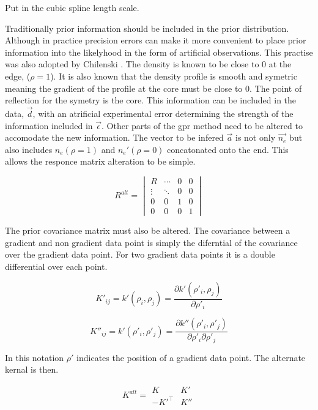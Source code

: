 Put in the cubic spline length scale. 

Traditionally prior information should be included in the prior distribution. Although in practice precision errors can make it more convenient to place prior information into the likelyhood in the form of artificial observations. This practise was also adopted by Chilenski \cite{chilenski}. The density is known to be close to 0 at the edge, ($\rho=1$). It is also known that the density profile is smooth and symetric meaning the gradient of the profile at the core must be close to 0. The point of reflection for the symetry is the core. This information can be included in the data, $\vec{d}$, with an atrificial experimental error determining the strength of the information included in $\vec{\epsilon}$. Other parts of the \gls{gpr} method need to be altered to accomodate the new information. The vector to be infered $\vec{a}$ is not only $\vec{n_e}$ but also includes $n_e(\rho=1)$ and $n_e'(\rho=0)$ concatonated onto the end. This allows the responce matrix alteration to be simple.

\begin{equation}
  R^{alt} =
  \begin{vmatrix}
    R & \cdots & 0 & 0\\
    \vdots & \ddots & 0 & 0\\
    0 & 0 & 1 & 0 \\
    0 & 0 & 0 & 1
  \end{vmatrix}
  \label{eq:Ralt}
\end{equation}

The prior covariance matrix must also be altered. The covariance between a gradient and non gradient data point is simply the diferntial of the covariance over the gradient data point. For two gradient data points it is a double differential over each point.

\begin{equation}
  K'_{ij} = k'(\rho_i, \rho_j) = \frac{\partial k'(\rho'_i, \rho_j)}{\partial \rho'_i}  
\end{equation}

\begin{equation}
  K''_{ij} = k'(\rho'_i, \rho'_j) = \frac{\partial k''(\rho'_i, \rho'_j)}{\partial \rho'_i \partial \rho'_j}  
\end{equation}

In this notation $\rho'$ indicates the position of a gradient data point. The alternate kernal is then.

\begin{equation}
  K^{alt} = 
    \begin{matrix}
      K & K'\\
      -K'^{\top} & K''
    \end{matrix}  
\end{equation}


